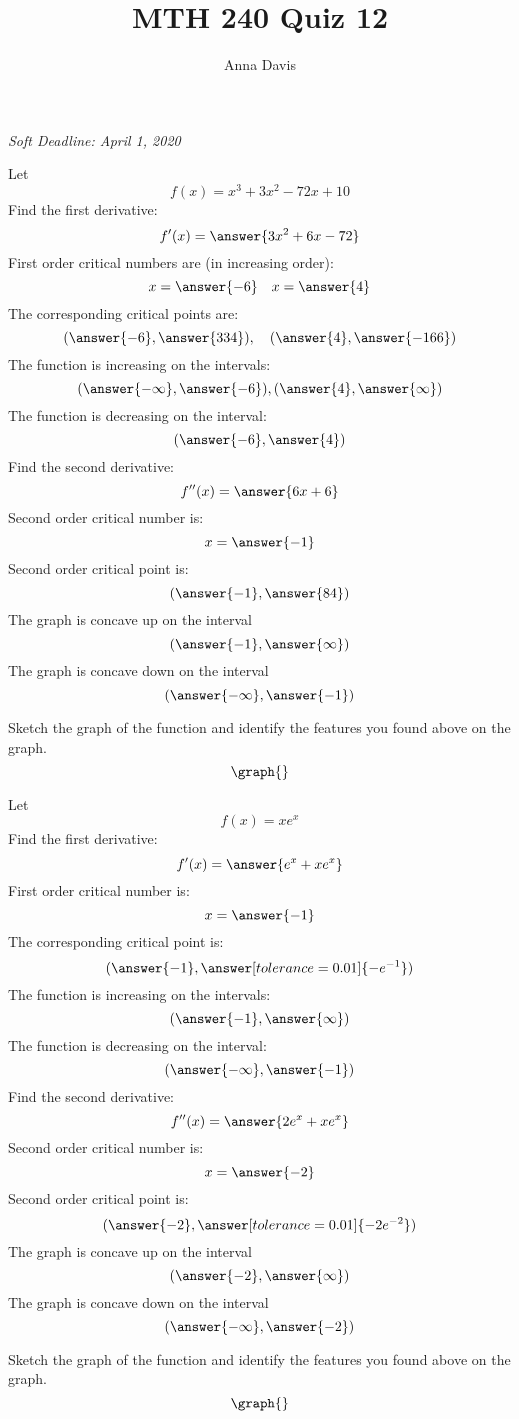 \documentclass{ximera}
\author{Anna Davis} \title{MTH 240 Quiz 12}
\begin{document}
\begin{abstract}

\end{abstract}
\maketitle
 \textit{Soft Deadline: April 1, 2020}
\begin{problem}\label{prob:240quiz12prob1}
Let $$f(x)=x^3+3x^2-72x+10$$
Find the first derivative:
$$f'(x)=\answer{3x^2+6x-72}$$
First order critical numbers are (in increasing order):
$$x=\answer{-6}\quad x=\answer{4}$$
The corresponding critical points are:
$$(\answer{-6}, \answer{334}),\quad (\answer{4}, \answer{-166})$$
The function is increasing on the intervals:
$$(\answer{-\infty},\answer{-6}), (\answer{4}, \answer{\infty})$$
The function is decreasing on the interval:
$$(\answer{-6},\answer{4})$$
Find the second derivative:
$$f''(x)=\answer{6x+6}$$
Second order critical number is:
$$x=\answer{-1}$$
Second order critical point is:
$$(\answer{-1}, \answer{84})$$
The graph is concave up on the interval
$$(\answer{-1}, \answer{\infty})$$
The graph is concave down on the interval
$$(\answer{-\infty}, \answer{-1})$$

Sketch the graph of the function and identify the features you found above on the graph.
\[
\graph{}
\]
\end{problem}

\begin{problem}\label{prob:240quiz12prob2}
Let $$f(x)=xe^x$$
Find the first derivative:
$$f'(x)=\answer{e^x+xe^x}$$
First order critical number is:
$$x=\answer{-1}$$
The corresponding critical point is:
$$(\answer{-1}, \answer[tolerance=0.01]{-e^{-1}})$$
The function is increasing on the intervals:
$$(\answer{-1},\answer{\infty})$$
The function is decreasing on the interval:
$$(\answer{-\infty}, \answer{-1})$$
Find the second derivative:
$$f''(x)=\answer{2e^x+xe^x}$$
Second order critical number is:
$$x=\answer{-2}$$
Second order critical point is:
$$(\answer{-2}, \answer[tolerance=0.01]{-2e^{-2}})$$
The graph is concave up on the interval
$$(\answer{-2}, \answer{\infty})$$
The graph is concave down on the interval
$$(\answer{-\infty}, \answer{-2})$$

Sketch the graph of the function and identify the features you found above on the graph.
\[
\graph{}
\]
\end{problem}
\end{document}
